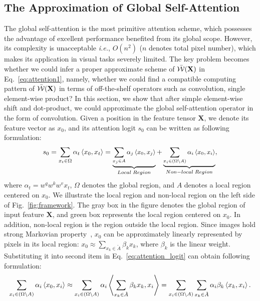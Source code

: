 \documentclass{article}
\begin{document}
\subsection{The Approximation of Global Self-Attention}
The global self-attention is the most primitive attention scheme, which possesses the advantage of excellent performance benefited from its global scope.
However, its complexity is unacceptable \emph{i.e.}, $O(n^2)$ ($n$ denotes total pixel number), which makes its application in visual tasks severely limited.
The key problem becomes whether we could infer a proper approximate scheme of {\small$\Bar{\mathcal{W}}(\mathbf{X})$} in Eq.~\ref{eq:attention1}, namely, whether we could find a compatible computing pattern of {\small$\Bar{\mathcal{W}}(\mathbf{X})$} in terms of off-the-shelf operators such as convolution, single element-wise product?
In this section, we show that after simple element-wise shift and dot-product, we could approximate the global self-attention operator in the form of convolution.
Given a position in the feature tensor $\mathbf{X}$, we denote its feature vector as $x_0$, and its attention logit $s_0$ can be written as following formulation:
\begin{equation}
\small
\centering
   s_0 = \sum_{x_t \in \Omega} \alpha_{t} \left \langle x_0,x_t\right\rangle
   = \underbrace{\sum_{x_j\in A} \alpha_j \left\langle x_0,x_j\right\rangle}_{Local\;Region} + \underbrace{\sum_{x_i\in (\Omega \setminus A)}\alpha_{i} \left\langle x_0,x_i\right\rangle}_{Non-local\;Region},
   \label{eq:attention_logit}
\end{equation}
where $\alpha_t = w^qw^kw^v x_t$, $\Omega$ denotes the global region, and $A$ denotes a local region centered on $x_0$.
We illustrate the local region and non-local region on the left side of Fig.~\ref{fig:framework}.
The gray box in the figure denotes the global region of input feature $\mathbf{X}$, and green box represents the local region centered on $x_0$.
In addition, non-local region is the region outside the local region.
Since images hold strong Markovian property~\cite{krahenbuhl2011efficient}, $x_0$ can be approximately linearly represented by pixels in its local region: {\small$x_0 \approx \sum_{x_k \in \mathring{A}} \beta_k x_k$},
where $\beta_k$ is the linear weight.
Substituting it into second item in Eq.~\ref{eq:attention_logit} can obtain following formulation:
\begin{equation}
\small
\sum_{x_i\in (\Omega\setminus A)}\alpha_{i} \left\langle x_0,x_i\right\rangle
\approx \sum_{x_i \in (\Omega\setminus A)} \alpha_i \left\langle \sum_{x_k\in \mathring{A}}\beta_k x_k,x_i\right\rangle = \sum_{x_i\in (\Omega\setminus A)} \sum_{x_k \in \mathring{A}}\alpha_i \beta_k \left\langle x_k,x_i\right\rangle.
\label{eq:second_item1}
\end{equation}
\end{document}
